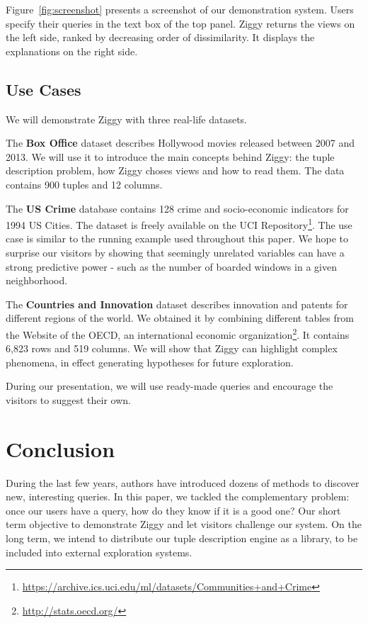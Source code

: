 Figure~\ref{fig:screenshot} presents a screenshot of our demonstration system.
Users specify their queries in the text box of the top panel. Ziggy returns the
views on the left side, ranked by decreasing order of dissimilarity.  It
displays the explanations on the right side.

\subsection{Use Cases}
\label{sec:usecases}

We will demonstrate Ziggy with three real-life datasets.
\begin{itemize0}
    \item The \textbf{Box Office} dataset describes Hollywood movies released
        between 2007 and 2013. We will use it to introduce the main concepts behind
        Ziggy: the tuple description problem, how Ziggy choses views and how to
        read them. The data contains 900 tuples and 12 columns.
    \item The \textbf{US Crime} database contains 128 crime and socio-economic
        indicators for 1994 US Cities. The dataset is freely available on the
        UCI Repository\footnote{\url{https://archive.ics.uci.edu/ml/datasets/Communities+and+Crime}}.
        The use case is similar to the running example used throughout this
        paper. We hope to surprise our visitors by showing that seemingly
        unrelated variables can have a strong predictive power - such as the
        number of boarded windows in a given neighborhood.
    \item The \textbf{Countries and Innovation} dataset describes innovation
        and patents for different regions of the world. We obtained it by
        combining different tables from the Website of the OECD, an international
        economic organization\footnote{\url{http://stats.oecd.org/}}. It
        contains 6,823 rows and 519 columns. We will show that Ziggy can
        highlight complex phenomena, in effect generating hypotheses for future
        exploration.
\end{itemize0}
During our presentation, we will use ready-made queries and encourage the
visitors to suggest their own.

\section{Conclusion}
\label{sec:conclusion}
During the last few years, authors have introduced dozens of methods to
discover new, interesting queries. In this paper, we tackled the complementary
problem: once our users have a query, how do they know if it is a good one?
Our short term objective to demonstrate Ziggy and let visitors challenge our
system. On the long term, we intend to distribute our tuple description engine
as a library, to be included into external exploration systems.

